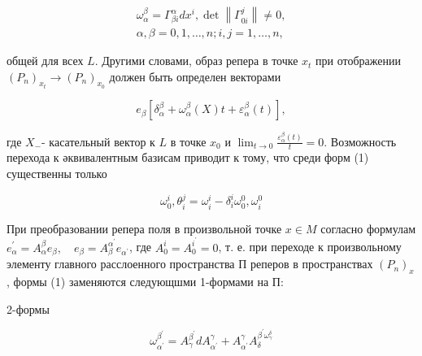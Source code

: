 \documentclass[10pt]{article}
\begin{document}
\[

\begin{gathered}

\omega_{\alpha}^{\beta}=\Gamma_{\beta i}^{\alpha} d x^{i}, \operatorname{det}\left\|\Gamma_{0 i}^{j}\right\| \neq 0, \\

\alpha, \beta=0,1, \ldots, n ; i, j=1, \ldots, n,

\end{gathered}

\]



общей для всех $L$. Другими словами, образ репера в точке $x_{t}$ при отображении $\left(P_{n}\right)_{x_{t}} \rightarrow\left(P_{n}\right)_{x_{0}}$ должен быть определен векторами



\[

e_{\beta}\left[\delta_{\alpha}^{\beta}+\omega_{\alpha}^{\beta}(X) t+\varepsilon_{\alpha}^{\beta}(t)\right],

\]



где $X_{-}$- касательный вектор к $L$ в точке $x_{0}$ и $\lim _{t \rightarrow 0} \frac{\varepsilon_{\alpha}^{\beta}(t)}{t}=0$. Возможность перехода к әквивалентным базисам приводит к тому, что среди форм (1) существенны только



\[

\omega_{0}^{i}, \theta_{i}^{j}=\omega_{i}^{i}-\delta_{i}^{i} \omega_{0}^{0}, \omega_{i}^{0}

\]



При преобразовании репера поля в произвольной точке $x \in M$ согласно формулам $e_{\alpha}^{\prime}=A_{\alpha}^{\beta} e_{\beta}, \quad e_{\beta}=A_{\beta}^{\alpha^{\prime}} e_{\alpha^{\prime}}$, где $A_{0}^{i}=A_{0}^{i^{\prime}}=0$, т. е. при переходе к произвольному элементу главного расслоенного пространства П реперов в пространствах $\left(P_{n}\right)_{x}$, формы (1) заменяются следующшми 1-формами на П:



2-формы



\[

\omega_{\alpha^{\prime}}^{\beta^{\prime}}=A_{\gamma}^{\beta^{\prime}} d A_{\alpha^{\prime}}^{\gamma}+A_{\alpha^{\prime}}^{\gamma} A_{\delta}^{\beta^{\prime} \omega_{\gamma}^{\delta}}

\]
\end{document}
